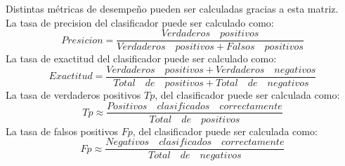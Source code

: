 Distintas métricas de desempeño pueden ser calculadas gracias a esta matriz.\\ 
La tasa de precision del clasificador puede ser calculado como: 
\begin{equation}
Presicion = \frac{Verdaderos \quad positivos}{Verdaderos \quad positivos + Falsos \quad positivos}
\end{equation}
La tasa de exactitud del clasificador puede ser calculado como: 
\begin{equation}
Exactitud = \frac{Verdaderos \quad positivos + Verdaderos \quad negativos}{Total \quad de \quad positivos + Total \quad de \quad negativos}
\end{equation}
La tasa de verdaderos positivos $Tp$, del clasificador puede ser calculada como: 
\begin{equation}
Tp \approx \frac{Positivos \quad clasificados \quad correctamente}{Total \quad de \quad  positivos}
\end{equation} 
La tasa de falsos positivos $Fp$, del clasificador puede ser calculada como: 
\begin{equation}
Fp \approx \frac{Negativos \quad clasificados \quad correctamente}{Total \quad de \quad negativos}
\end{equation}






\newpage

